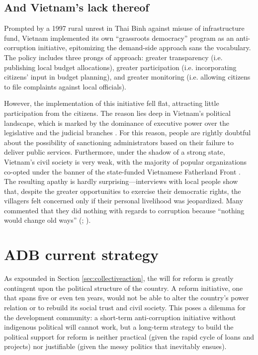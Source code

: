 \documentclass[12pt]{article}
\begin{document}
\subsection{And Vietnam's lack thereof} \label{sec:Vietnam}

Prompted by a 1997 rural unrest in Thai Binh against misuse of infrastructure fund, Vietnam implemented its own ``grassroots democracy'' program as an anti-corruption initiative, epitomizing the demand-side approach sans the vocabulary. The policy includes three prongs of approach: greater transparency (i.e. publishing local budget allocations), greater participation (i.e. incorporating citizens' input in budget planning), and greater monitoring (i.e. allowing citizens to file complaints against local officials).

However, the implementation of this initiative fell flat, attracting little participation from the citizens. The reason lies deep in Vietnam's political landscape, which is marked by the dominance of executive power over the legislative and the judicial branches \citep{Vasavakul2002}. For this reason, people are rightly doubtful about the possibility of sanctioning administrators based on their failure to deliver public services. Furthermore, under the shadow of a strong state, Vietnam's civil society is very weak, with the majority of popular organizations co-opted under the banner of the state-funded Vietnamese Fatherland Front \citep[3]{Thayer2009}. The resulting apathy is hardly surprising---interviews with local people show that, despite the greater opportunities to exercise their democratic rights, the villagers felt concerned only if their personal livelihood was jeopardized. Many commented that they did nothing with regards to corruption because ``nothing would change old ways'' (\citealp[28]{Duong2004}; \citealp{Fritzen2005}).

\section{ADB current strategy} \label{sec:currentstrategy}

As expounded in Section \ref{sec:collectiveaction}, the will for reform is greatly contingent upon the political structure of the country. A reform initiative, one that spans five or even ten years, would not be able to alter the country's power relation or to rebuild its social trust and civil society. This poses a dilemma for the development community: a short-term anti-corruption initiative without indigenous political will cannot work, but a long-term strategy to build the political support for reform is neither practical (given the rapid cycle of loans and projects) nor justifiable (given the messy politics that inevitably ensues).
\end{document}
